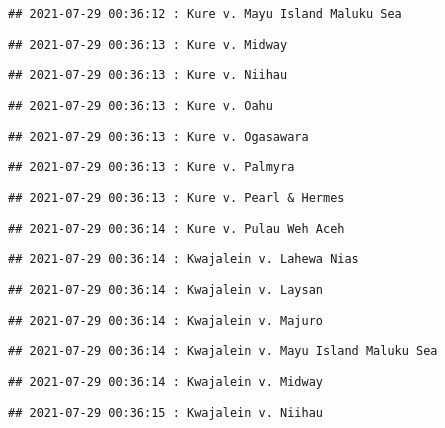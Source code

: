 \documentclass[
]{article}
\begin{document}
\begin{verbatim}
## 2021-07-29 00:36:12 : Kure v. Mayu Island Maluku Sea
\end{verbatim}

\begin{verbatim}
## 2021-07-29 00:36:13 : Kure v. Midway
\end{verbatim}

\begin{verbatim}
## 2021-07-29 00:36:13 : Kure v. Niihau
\end{verbatim}

\begin{verbatim}
## 2021-07-29 00:36:13 : Kure v. Oahu
\end{verbatim}

\begin{verbatim}
## 2021-07-29 00:36:13 : Kure v. Ogasawara
\end{verbatim}

\begin{verbatim}
## 2021-07-29 00:36:13 : Kure v. Palmyra
\end{verbatim}

\begin{verbatim}
## 2021-07-29 00:36:13 : Kure v. Pearl & Hermes
\end{verbatim}

\begin{verbatim}
## 2021-07-29 00:36:14 : Kure v. Pulau Weh Aceh
\end{verbatim}

\begin{verbatim}
## 2021-07-29 00:36:14 : Kwajalein v. Lahewa Nias
\end{verbatim}

\begin{verbatim}
## 2021-07-29 00:36:14 : Kwajalein v. Laysan
\end{verbatim}

\begin{verbatim}
## 2021-07-29 00:36:14 : Kwajalein v. Majuro
\end{verbatim}

\begin{verbatim}
## 2021-07-29 00:36:14 : Kwajalein v. Mayu Island Maluku Sea
\end{verbatim}

\begin{verbatim}
## 2021-07-29 00:36:14 : Kwajalein v. Midway
\end{verbatim}

\begin{verbatim}
## 2021-07-29 00:36:15 : Kwajalein v. Niihau
\end{verbatim}
\end{document}
